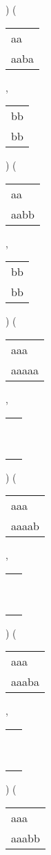 \begin{description}
\begin{tabular}{|l|}
\hline
\end{tabular} 
) 
 ( 
\begin{tabular}{|l|} \hline
aa\ \  \\
aaba \\
\hline
\end{tabular} 
 , 
\begin{tabular}{|l|} \hline
bb \\
bb \\
\hline
\end{tabular} 
) 
 ( 
\begin{tabular}{|l|} \hline
aa\ \  \\
aabb \\
\hline
\end{tabular} 
 , 
\begin{tabular}{|l|} \hline
bb \\
bb \\
\hline
\end{tabular} 
) 
 ( 
\begin{tabular}{|l|} \hline
aaa\ \  \\
aaaaa \\
\hline
\end{tabular} 
 , 
\begin{tabular}{|l|} \hline
\ \\ \ \\ \hline
\end{tabular} 
) 
 ( 
\begin{tabular}{|l|} \hline
aaa\ \  \\
aaaab \\
\hline
\end{tabular} 
 , 
\begin{tabular}{|l|} \hline
\ \\ \ \\ \hline
\end{tabular} 
) 
 ( 
\begin{tabular}{|l|} \hline
aaa\ \  \\
aaaba \\
\hline
\end{tabular} 
 , 
\begin{tabular}{|l|} \hline
\ \\ \ \\ \hline
\end{tabular} 
) 
 ( 
\begin{tabular}{|l|} \hline
aaa\ \  \\
aaabb \\
\hline
\end{tabular} 

\end{description}
